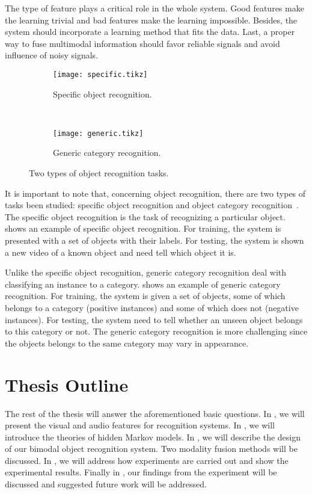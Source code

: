 \documentclass[12pt,final,twoside]{report}
\begin{document}
The type of feature plays a critical role in the whole system. Good features make the learning trivial and bad features make the learning impossible.
Besides, the system should incorporate a learning method that fits the data.
Last, a proper way to fuse multimodal information should favor reliable signals and avoid influence of noisy signals.

\begin{figure}[t]
  \centering
  \begin{subfigure}[b]{.9\textwidth}
    \texttt{[image: specific.tikz]}
    \caption{Specific object recognition.}
    \label{fig:specific}
  \end{subfigure}

  ~

  \begin{subfigure}[b]{.9\textwidth}
    \texttt{[image: generic.tikz]}
    \caption{Generic category recognition.}
    \label{fig:generic}
  \end{subfigure}

  \caption{Two types of object recognition tasks.}
\end{figure}

It is important to note that, concerning object recognition, there are two types of tasks been studied: specific object recognition and object category recognition~\cite{grauman_visual_2011}. The specific object recognition is the task of recognizing a particular object.  shows an example of specific object recognition. For training, the system is presented with a set of objects with their labels. For testing, the system is shown a new video of a known object and need tell which object it is.

Unlike the specific object recognition, generic category recognition deal with classifying an instance to a category.  shows an example of generic category recognition. For training, the system is given a set of objects, some of which belongs to a category (positive instances) and some of which does not (negative instances). For testing, the system need to tell whether an unseen object belongs to this category or not. The generic category recognition is more challenging since the objects belongs to the same category may vary in appearance.

\section{Thesis Outline}
The rest of the thesis will answer the aforementioned basic questions.
In , we will present the visual and audio features for recognition systems.
In , we will introduce the theories of hidden Markov models.  
In , we will describe the design of our bimodal object recognition system. Two modality fusion methods will be discussed.  
In , we will address how experiments are carried out and show the experimental results.  
Finally in , our findings from the experiment will be discussed and suggested future work will be addressed.
\end{document}
